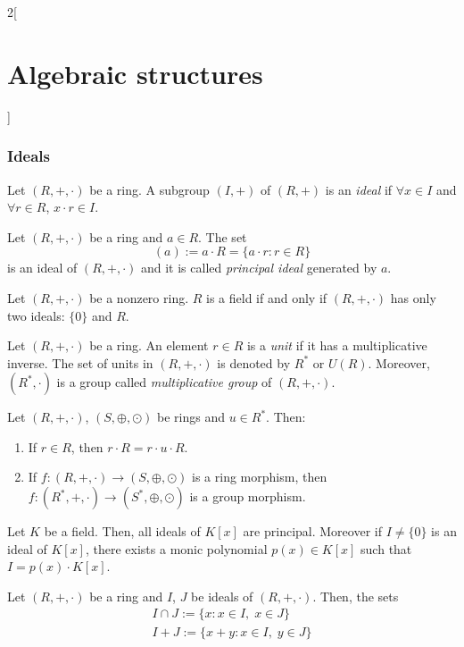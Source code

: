\documentclass[../../../main_math.tex]{subfiles}
\begin{document}
\begin{multicols}{2}[\section{Algebraic structures}]
  \subsubsection{Ideals}
  \begin{definition}[Ideal]
    Let $(R,+,\cdot)$ be a ring. A subgroup $(I,+)$ of $(R,+)$ is an \emph{ideal} if $\forall x\in I$ and $\forall r\in R$, $x\cdot r\in I$.
  \end{definition}
  \begin{lemma}
    Let $(R,+,\cdot)$ be a ring and $a\in R$. The set $$(a):=a\cdot R=\{a\cdot r:r\in R\}$$ is an ideal of $(R,+,\cdot)$ and it is called \emph{principal ideal} generated by $a$.
  \end{lemma}
  \begin{proposition}
    Let $(R,+,\cdot)$ be a nonzero ring. $R$ is a field if and only if $(R,+,\cdot)$ has only two ideals: $\{0\}$ and $R$.
  \end{proposition}
  \begin{definition}
    Let $(R,+,\cdot)$ be a ring. An element $r\in R$ is a \emph{unit} if it has a multiplicative inverse. The set of units in $(R,+,\cdot)$ is denoted by $R^*$ or $U(R)$. Moreover, $(R^*,\cdot)$ is a group called \emph{multiplicative group} of $(R,+,\cdot)$.
  \end{definition}
  \begin{lemma}
    Let $(R,+,\cdot)$, $(S,\oplus,\odot)$ be rings and $u\in R^*$. Then:
    \begin{enumerate}
      \item If $r\in R$, then $r\cdot R=r\cdot u\cdot R$.
      \item If $f:(R,+,\cdot)\rightarrow (S,\oplus,\odot)$ is a ring morphism, then $f:(R^*,+,\cdot)\rightarrow (S^*,\oplus,\odot)$ is a group morphism.
    \end{enumerate}
  \end{lemma}
  \begin{proposition}
    Let $K$ be a field. Then, all ideals of $K[x]$ are principal. Moreover if $I\ne\{0\}$ is an ideal of $K[x]$, there exists a monic polynomial $p(x)\in K[x]$ such that $I=p(x)\cdot K[x]$.
  \end{proposition}
  \begin{proposition}
    Let $(R,+,\cdot)$ be a ring and $I$, $J$ be ideals of $(R,+,\cdot)$. Then, the sets
    \begin{gather*}
      I\cap J:=\{x:x\in I,\;x\in J\}\\
      I+J:=\{x+y:x\in I,\;y\in J\}\\

\end{gather*}
\end{proposition}
\end{multicols}
\end{document}
